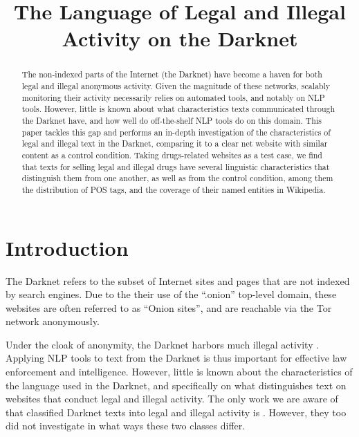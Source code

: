 \documentclass[11pt,a4paper,table]{article}
\title{The Language of Legal and Illegal Activity on the Darknet}
\date{}
\begin{document}
\maketitle

\begin{abstract}
  The non-indexed parts of the Internet (the Darknet)
   have become a haven for both legal and illegal anonymous activity.
  Given the magnitude of these networks, scalably monitoring their activity necessarily relies
    on automated tools, and notably on NLP tools.
  However, little is known about what characteristics texts communicated through the Darknet have, 
    and how well do off-the-shelf NLP tools do on this domain.
  This paper tackles this gap and performs an in-depth investigation of the characteristics
    of legal and illegal text in the Darknet, comparing it to a clear net website with similar
    content as a control condition.
  Taking drugs-related websites as a test case, we find that texts for selling legal and illegal drugs
    have several linguistic characteristics that distinguish them from one another, as well as from 
    the control condition, among them the distribution of POS tags, and the coverage of their named entities in Wikipedia.
\end{abstract}



\section{Introduction}

  The Darknet refers to the subset of Internet sites and pages that are not
  indexed by search engines.
  Due to the their use of the ``.onion'' top-level domain, these websites are
  often referred to as ``Onion sites'', and are reachable via the Tor network
  anonymously.
  
  Under the cloak of anonymity, the Darknet harbors much illegal activity \citep{moore2016cryptopolitik}.
  Applying NLP tools to text from the Darknet is thus important for effective law enforcement and intelligence.
  However, little is known about the characteristics of the language used in the Darknet, 
  and specifically on what distinguishes text on websites that conduct legal and illegal activity.
	The only work we are aware of that classified Darknet texts into legal and illegal activity is \citet{Avarikioti18}.
	However, they too did not investigate in what ways these two classes differ.
  
\end{document}

